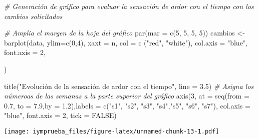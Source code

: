 \documentclass[
  12pt,
]{article}
\newenvironment{Shaded}{\begin{snugshade}}{\end{snugshade}}
\newcommand{\AttributeTok}[1]{\textcolor[rgb]{0.77,0.63,0.00}{#1}}
\newcommand{\CommentTok}[1]{\textcolor[rgb]{0.56,0.35,0.01}{\textit{#1}}}
\newcommand{\ConstantTok}[1]{\textcolor[rgb]{0.00,0.00,0.00}{#1}}
\newcommand{\DecValTok}[1]{\textcolor[rgb]{0.00,0.00,0.81}{#1}}
\newcommand{\FloatTok}[1]{\textcolor[rgb]{0.00,0.00,0.81}{#1}}
\newcommand{\FunctionTok}[1]{\textcolor[rgb]{0.00,0.00,0.00}{#1}}
\newcommand{\NormalTok}[1]{#1}
\newcommand{\OtherTok}[1]{\textcolor[rgb]{0.56,0.35,0.01}{#1}}
\newcommand{\StringTok}[1]{\textcolor[rgb]{0.31,0.60,0.02}{#1}}
\begin{document}
\begin{Shaded}
\begin{Highlighting}[]
\CommentTok{\# Generación de gráfico para evaluar la sensación de ardor con el tiempo con los cambios solicitados}

\CommentTok{\# Amplia el margen de la hoja del gráfico}
\FunctionTok{par}\NormalTok{(}\AttributeTok{mar =} \FunctionTok{c}\NormalTok{(}\DecValTok{5}\NormalTok{, }\DecValTok{5}\NormalTok{, }\DecValTok{5}\NormalTok{, }\DecValTok{5}\NormalTok{))}
\NormalTok{cambios }\OtherTok{\textless{}{-}} \FunctionTok{barplot}\NormalTok{(data,}
        \AttributeTok{ylim=}\FunctionTok{c}\NormalTok{(}\DecValTok{0}\NormalTok{,}\DecValTok{4}\NormalTok{),}
        \AttributeTok{xaxt =} \StringTok{\textquotesingle{}n\textquotesingle{}}\NormalTok{,}
        \AttributeTok{col =} \FunctionTok{c}\NormalTok{ (}\StringTok{"red"}\NormalTok{, }\StringTok{"white"}\NormalTok{),}
        \AttributeTok{col.axis =} \StringTok{"blue"}\NormalTok{,}
        \AttributeTok{font.axis =} \DecValTok{2}\NormalTok{,}

      
\NormalTok{)}

\FunctionTok{title}\NormalTok{(}\StringTok{"Evolución de la sensación de ardor con el tiempo"}\NormalTok{, }\AttributeTok{line =} \FloatTok{3.5}\NormalTok{)}
\CommentTok{\# Asigna los númeroas de las semanas a la parte superior del gráfico}
\FunctionTok{axis}\NormalTok{(}\DecValTok{3}\NormalTok{, }\AttributeTok{at =} \FunctionTok{seq}\NormalTok{(}\AttributeTok{from =} \FloatTok{0.7}\NormalTok{, }\AttributeTok{to =} \FloatTok{7.9}\NormalTok{,}\AttributeTok{by =} \FloatTok{1.2}\NormalTok{),}\AttributeTok{labels =} \FunctionTok{c}\NormalTok{(}\StringTok{"s1"}\NormalTok{, }\StringTok{"s2"}\NormalTok{, }\StringTok{"s3"}\NormalTok{, }\StringTok{"s4"}\NormalTok{,}\StringTok{"s5"}\NormalTok{, }\StringTok{"s6"}\NormalTok{, }\StringTok{"s7"}\NormalTok{), }
     \AttributeTok{col.axis =} \StringTok{"blue"}\NormalTok{, }\AttributeTok{font.axis =} \DecValTok{2}\NormalTok{, }\AttributeTok{tick =} \ConstantTok{FALSE}\NormalTok{)}
\end{Highlighting}
\end{Shaded}

\texttt{[image: iymprueba\_files/figure-latex/unnamed-chunk-13-1.pdf]}
\end{document}
